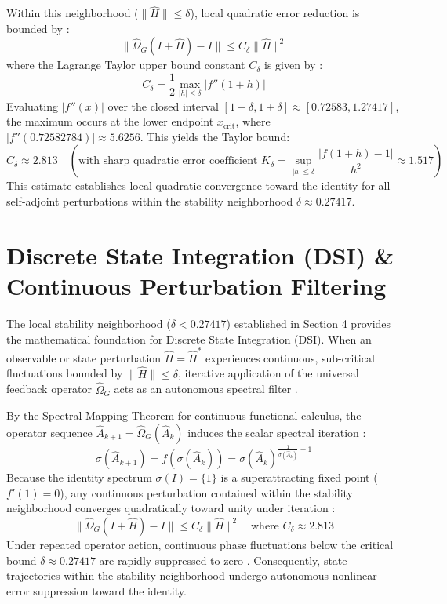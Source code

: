\documentclass[11pt,a4paper]{article}
\begin{document}
Within this neighborhood ($\|\hat{H}\| \le \delta$), local quadratic error reduction is bounded by \cite{Banach,Pedersen}:
\begin{equation}
\|\hat{\Omega}_G(I + \hat{H}) - I\| \le C_\delta \|\hat{H}\|^2
\end{equation}
where the Lagrange Taylor upper bound constant $C_\delta$ is given by \cite{Banach,Zeidler}:
\begin{equation}
C_\delta = \frac{1}{2} \max_{|h| \le \delta} |f''(1+h)|
\end{equation}
Evaluating $|f''(x)|$ over the closed interval $[1 - \delta, 1 + \delta] \approx [0.72583, 1.27417]$, the maximum occurs at the lower endpoint $x_{\text{crit}}$, where $|f''(0.72582784)| \approx 5.6256$. This yields the Taylor bound:
\begin{equation}
C_\delta \approx 2.813 \quad \left(\text{with sharp quadratic error coefficient } K_\delta = \sup_{|h| \le \delta} \frac{|f(1+h) - 1|}{h^2} \approx 1.517\right)
\end{equation}
This estimate establishes local quadratic convergence toward the identity for all self-adjoint perturbations within the stability neighborhood $\delta \approx 0.27417$.

\section{Discrete State Integration (DSI) \& Continuous Perturbation Filtering}

The local stability neighborhood ($\delta < 0.27417$) established in Section 4 provides the mathematical foundation for Discrete State Integration (DSI). When an observable or state perturbation $\hat{H} = \hat{H}^*$ experiences continuous, sub-critical fluctuations bounded by $\|\hat{H}\| \le \delta$, iterative application of the universal feedback operator $\hat{\Omega}_G$ acts as an autonomous spectral filter \cite{Murphy,Pedersen}.

By the Spectral Mapping Theorem for continuous functional calculus, the operator sequence $\hat{A}_{k+1} = \hat{\Omega}_G(\hat{A}_k)$ induces the scalar spectral iteration \cite{Murphy,Pedersen}:
\begin{equation}
\sigma(\hat{A}_{k+1}) = f(\sigma(\hat{A}_k)) = \sigma(\hat{A}_k)^{\frac{1}{\sigma(\hat{A}_k)} - 1}
\end{equation}
Because the identity spectrum $\sigma(I) = \{1\}$ is a superattracting fixed point ($f'(1) = 0$), any continuous perturbation contained within the stability neighborhood converges quadratically toward unity under iteration \cite{Banach,GrayAnanke}:
\begin{equation}
\|\hat{\Omega}_G(I + \hat{H}) - I\| \le C_\delta \|\hat{H}\|^2 \quad \text{where } C_\delta \approx 2.813
\end{equation}
Under repeated operator action, continuous phase fluctuations below the critical bound $\delta \approx 0.27417$ are rapidly suppressed to zero \cite{Banach,GrayAnanke}. Consequently, state trajectories within the stability neighborhood undergo autonomous nonlinear error suppression toward the identity.
\end{document}
